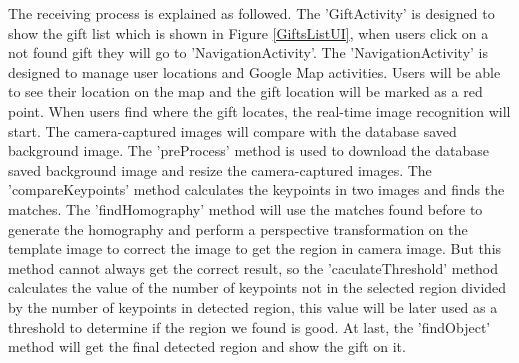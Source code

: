 \par The receiving process is explained as followed. The 'GiftActivity' is designed to show the gift list which is shown in Figure \ref{GiftsListUI}, when users click on a not found gift they will go to 'NavigationActivity'. The 'NavigationActivity' is designed to manage user locations and Google Map activities. Users will be able to see their location on the map and the gift location will be marked as a red point. When users find where the gift locates, the real-time image recognition will start. The camera-captured images will compare with the database saved background image. The 'preProcess' method is used to download the database saved background image and resize the camera-captured images. The 'compareKeypoints' method calculates the keypoints in two images and finds the matches. The 'findHomography' method will use the matches found before to generate the homography and perform a perspective transformation on the template image to correct the image to get the region in camera image. But this method cannot always get the correct result, so the 'caculateThreshold' method calculates the value of the number of keypoints not in the selected region divided by the number of keypoints in detected region, this value will be later used as a threshold to determine if the region we found is good. At last, the 'findObject' method will get the final detected region and show the gift on it.